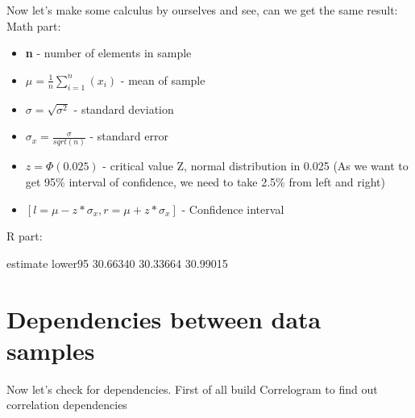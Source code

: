 \documentclass{article}
\begin{document}
Now let's make some calculus by ourselves and see, can we get the same result:
\newline
Math part:
\begin{itemize}
  \item \textbf{n} - number of elements in sample
  \item \textbf{\(\mu = \frac{1}{n}\sum_{i=1}^{n}(x_i)\)} - mean of sample
  \item \textbf{\(\sigma = \sqrt{\sigma^2}\)} - standard deviation
  \item \textbf{\(\sigma_{x} = \frac{\sigma}{sqrt(n)}\)} - standard error
  \item \textbf{\(z = \Phi(0.025)\)} - critical value Z, normal distribution in 0.025 (As we want to get 95\% interval of confidence, we need to take 2.5\% from left and right)
  \item \textbf{\([l=\mu-z*\sigma_{x},r = \mu+z* \sigma_{x}]\)} - Confidence interval 
  \end{itemize}
R part:
\begin{Schunk}
\begin{Soutput}
estimate lower95%
30.66340 30.33664 30.99015 
\end{Soutput}
\end{Schunk}

\section{Dependencies between data samples}

Now let's check for dependencies. First of all build Correlogram to find out correlation dependencies
\end{document}
